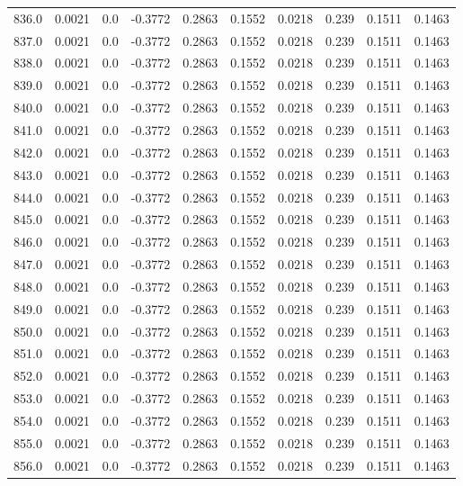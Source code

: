 \begin{longtable}{lrrrrrrrrr}
836.0 & 0.0021 & 0.0 & -0.3772 & 0.2863 & 0.1552 & 0.0218 & 0.239 & 0.1511 & 0.1463 \\
837.0 & 0.0021 & 0.0 & -0.3772 & 0.2863 & 0.1552 & 0.0218 & 0.239 & 0.1511 & 0.1463 \\
838.0 & 0.0021 & 0.0 & -0.3772 & 0.2863 & 0.1552 & 0.0218 & 0.239 & 0.1511 & 0.1463 \\
839.0 & 0.0021 & 0.0 & -0.3772 & 0.2863 & 0.1552 & 0.0218 & 0.239 & 0.1511 & 0.1463 \\
840.0 & 0.0021 & 0.0 & -0.3772 & 0.2863 & 0.1552 & 0.0218 & 0.239 & 0.1511 & 0.1463 \\
841.0 & 0.0021 & 0.0 & -0.3772 & 0.2863 & 0.1552 & 0.0218 & 0.239 & 0.1511 & 0.1463 \\
842.0 & 0.0021 & 0.0 & -0.3772 & 0.2863 & 0.1552 & 0.0218 & 0.239 & 0.1511 & 0.1463 \\
843.0 & 0.0021 & 0.0 & -0.3772 & 0.2863 & 0.1552 & 0.0218 & 0.239 & 0.1511 & 0.1463 \\
844.0 & 0.0021 & 0.0 & -0.3772 & 0.2863 & 0.1552 & 0.0218 & 0.239 & 0.1511 & 0.1463 \\
845.0 & 0.0021 & 0.0 & -0.3772 & 0.2863 & 0.1552 & 0.0218 & 0.239 & 0.1511 & 0.1463 \\
846.0 & 0.0021 & 0.0 & -0.3772 & 0.2863 & 0.1552 & 0.0218 & 0.239 & 0.1511 & 0.1463 \\
847.0 & 0.0021 & 0.0 & -0.3772 & 0.2863 & 0.1552 & 0.0218 & 0.239 & 0.1511 & 0.1463 \\
848.0 & 0.0021 & 0.0 & -0.3772 & 0.2863 & 0.1552 & 0.0218 & 0.239 & 0.1511 & 0.1463 \\
849.0 & 0.0021 & 0.0 & -0.3772 & 0.2863 & 0.1552 & 0.0218 & 0.239 & 0.1511 & 0.1463 \\
850.0 & 0.0021 & 0.0 & -0.3772 & 0.2863 & 0.1552 & 0.0218 & 0.239 & 0.1511 & 0.1463 \\
851.0 & 0.0021 & 0.0 & -0.3772 & 0.2863 & 0.1552 & 0.0218 & 0.239 & 0.1511 & 0.1463 \\
852.0 & 0.0021 & 0.0 & -0.3772 & 0.2863 & 0.1552 & 0.0218 & 0.239 & 0.1511 & 0.1463 \\
853.0 & 0.0021 & 0.0 & -0.3772 & 0.2863 & 0.1552 & 0.0218 & 0.239 & 0.1511 & 0.1463 \\
854.0 & 0.0021 & 0.0 & -0.3772 & 0.2863 & 0.1552 & 0.0218 & 0.239 & 0.1511 & 0.1463 \\
855.0 & 0.0021 & 0.0 & -0.3772 & 0.2863 & 0.1552 & 0.0218 & 0.239 & 0.1511 & 0.1463 \\
856.0 & 0.0021 & 0.0 & -0.3772 & 0.2863 & 0.1552 & 0.0218 & 0.239 & 0.1511 & 0.1463 \\

\end{longtable}
